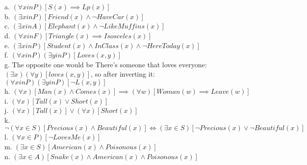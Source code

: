 \documentclass{article}
\begin{document}
\section{}
a. $(\forall x in P)[S(x) \implies Lp(x)]$ \\
b. $(\exists x in P)[Friend(x) \wedge \neg HaveCar(x)]$ \\
c. $(\exists x in A)[Elephant(x) \wedge \neg LikeMuffins(x)]$ \\
d. $(\forall x in F)[Triangle(x) \implies Isosceles(x)]$ \\
e. $(\exists x in P)[Student(x) \wedge InClass(x) \wedge \neg HereToday(x)]$ \\
f. $(\forall x in P)(\exists y in P)[Loves(x, y)]$ \\
g. The opposite one would be There's someone that loves everyone: $(\exists x)(\forall y)[loves(x, y)]$, so after inverting it: \\
$(\forall x in P)(\exists y in P)[\neg L(x, y)]$\\
h. $(\forall x)[Man(x) \wedge Comes(x)] \implies (\forall w)[Woman(w) \implies Leave(w)]$\\
i. $(\forall x)[Tall(x) \vee Short(x)]$\\
j. $(\forall x)[Tall(x)] \vee (\forall x)[Short(x)]$\\
k. $\neg (\forall x \in S)[Precious(x) \wedge Beautiful(x)] \Leftrightarrow (\exists x \in S)[\neg Precious(x) \vee \neg Beautiful(x)]$\\
l. $(\forall x \in P)[\neg LovesMe(x)]$ \\
m. $(\exists x \in S)[American(x) \wedge Poisonous(x)]$ \\
n. $(\exists x \in A)[Snake(x) \wedge American(x) \wedge Poisonous(x)]$ \\
\end{document}
